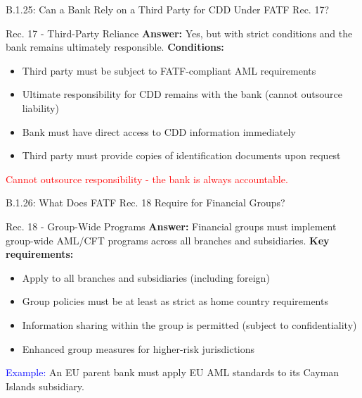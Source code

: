 \documentclass{beamer}
\begin{document}
	\begin{frame}{B.1.25: Can a Bank Rely on a Third Party for CDD Under FATF Rec. 17?}
		\begin{block}{Rec. 17 - Third-Party Reliance}
			\textbf{Answer:} Yes, but with strict conditions and the bank remains ultimately responsible.
			\vspace{0.2cm}
			\textbf{Conditions:}
			\begin{itemize}
				\item Third party must be subject to FATF-compliant AML requirements
				\item Ultimate responsibility for CDD remains with the bank (cannot outsource liability)
				\item Bank must have direct access to CDD information immediately
				\item Third party must provide copies of identification documents upon request
			\end{itemize}
			\textcolor{red}{Cannot outsource responsibility - the bank is always accountable.}
		\end{block}
	\end{frame}
	
	\begin{frame}{B.1.26: What Does FATF Rec. 18 Require for Financial Groups?}
		\begin{block}{Rec. 18 - Group-Wide Programs}
			\textbf{Answer:} Financial groups must implement group-wide AML/CFT programs across all branches and subsidiaries.
			\vspace{0.2cm}
			\textbf{Key requirements:}
			\begin{itemize}
				\item Apply to all branches and subsidiaries (including foreign)
				\item Group policies must be at least as strict as home country requirements
				\item Information sharing within the group is permitted (subject to confidentiality)
				\item Enhanced group measures for higher-risk jurisdictions
			\end{itemize}
			\textcolor{blue}{Example:} An EU parent bank must apply EU AML standards to its Cayman Islands subsidiary.
		\end{block}
	\end{frame}
	
\end{document}
